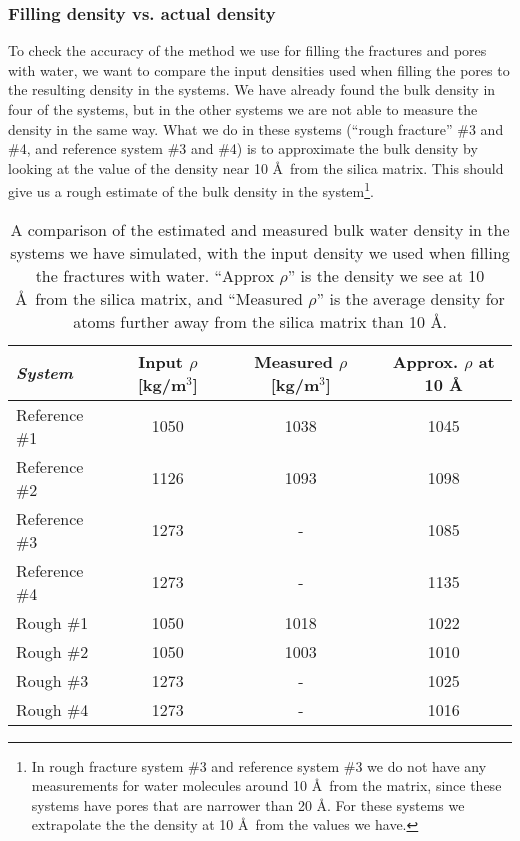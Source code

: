 \subsubsection*{Filling density vs. actual density}
To check the accuracy of the method we use for filling the fractures and pores with water, we want to compare the input densities used when filling the pores to the resulting density in the systems. We have already found the bulk density in four of the systems, but in the other systems we are not able to measure the density in the same way. What we do in these systems (``rough fracture'' \#3 and \#4, and reference system \#3 and \#4) is to approximate the bulk density by looking at the value of the density near 10 \AA\ from the silica matrix. This should give us a rough estimate of the bulk density in the system\footnote{In rough fracture system \#3 and reference system \#3 we do not have any measurements for water molecules around 10 \AA\ from the matrix, since these systems have pores that are narrower than 20 \AA. For these systems we extrapolate the the density at 10 \AA\ from the values we have.}.
%
\begin{table}[!htb]%
    \centering%
    \begin{tabular}{l|ccc}%
    \textit{System} & Input $\rho$ [kg/m$^3$]  & Measured $\rho$ [kg/m$^3$]   & Approx. $\rho$ at 10 \AA \\ \hline
    Reference \#1   & 1050                  & 1038                      & 1045 \\
    Reference \#2   & 1126                  & 1093                      & 1098 \\
    Reference \#3   & 1273                  & -                         & 1085 \\
    Reference \#4   & 1273                  & -                         & 1135 \\
    Rough \#1       & 1050                  & 1018                      & 1022 \\
    Rough \#2       & 1050                  & 1003                      & 1010 \\
    Rough \#3       & 1273                  & -                         & 1025 \\
    Rough \#4       & 1273                  & -                         & 1016 \\
    \end{tabular}%
    \vspace{8pt}%
    \caption{%
        A comparison of the estimated and measured bulk water density in the systems we have simulated, with the input density we used when filling the fractures with water. ``Approx $\rho$'' is the density we see at 10 \AA\ from the silica matrix, and ``Measured $\rho$'' is the average density for atoms further away from the silica matrix than 10 \AA.%
        \label{tab:estimate_bulk_density}%
    }%
\end{table}%


